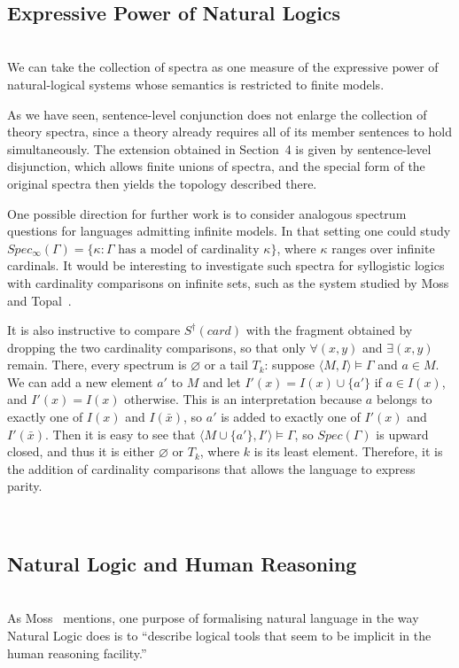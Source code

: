\documentclass[12pt, reqno]{amsart}
\theoremstyle{definition}
\theoremstyle{remark}
\numberwithin{equation}{section}
\begin{document}
\hfill \\ 
\subsection{Expressive Power of Natural Logics} \hfill \\ 
We can take the collection of spectra as one measure of the expressive power of natural-logical systems whose semantics is restricted to finite models. 

As we have seen, sentence-level conjunction does not enlarge the collection of theory spectra, since a theory already requires all of its member sentences to hold simultaneously. The extension obtained in Section~4 is given by sentence-level disjunction, which allows finite unions of spectra, and the special form of the original spectra then yields the topology described there.

One possible direction for further work is to consider analogous spectrum questions for languages admitting infinite models. In that setting one could study $Spec_\infty(\Gamma) = \{\kappa:
\Gamma\text{ has a model of cardinality }\kappa\}$, 
where $\kappa$ ranges over infinite cardinals. It would be interesting to investigate such spectra for syllogistic logics with cardinality comparisons on infinite sets, such as the system studied by Moss and Topal~\cite{CardComp}.

It is also instructive to compare $S^\dagger(card)$ with the fragment obtained
by dropping the two cardinality comparisons, so that only $\forall(x,y)$ and
$\exists(x,y)$ remain. There, every spectrum is $\varnothing$ or a tail $T_k$: suppose $\langle M, I\rangle \models \Gamma$ and $a \in M$. We can add a new element $a'$ to $M$ and let $I'(x) = I(x) \cup \{a'\}$ if $a \in I(x)$, and $I'(x) = I(x)$ otherwise. This is an interpretation because $a$ belongs to exactly one of $I(x)$ and $I(\bar x)$, so $a'$ is added to exactly one of $I'(x)$ and $I'(\bar x)$. Then it is easy to see that $\langle M \cup \{a'\}, I'\rangle \models \Gamma$, so $Spec(\Gamma)$ is upward closed, and thus it is either $\varnothing$ or $T_k$, where $k$ is its least element. Therefore, it is the addition of cardinality comparisons that allows the language to express parity.


\hfill \\ 
\subsection{Natural Logic and Human Reasoning} \hfill \\ 
As Moss~\cite{Larry} mentions, one purpose of formalising natural language in the way Natural Logic does is to ``describe logical tools that seem to be implicit in the human reasoning facility.''  
\end{document}
